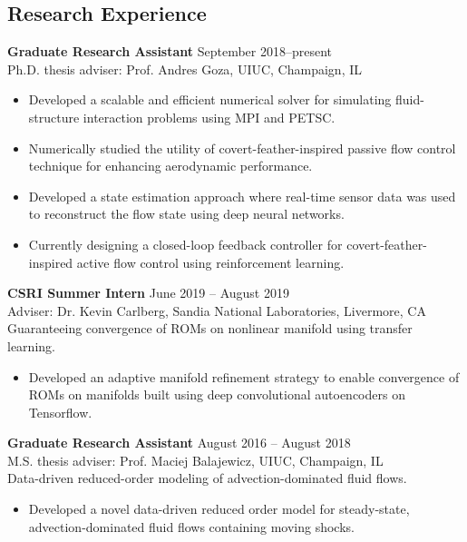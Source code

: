 \documentclass[margin]{res}
\begin{document}
\begin{resume}
\section{\large Research Experience}
{\bf Graduate Research Assistant} \hfill September 2018--present\\
Ph.D. thesis adviser: Prof. Andres Goza, UIUC, Champaign, IL 
\begin{itemize}
	\item Developed a scalable and efficient numerical solver for simulating fluid-structure interaction problems using MPI and PETSC.
	\item Numerically studied the utility of covert-feather-inspired passive flow control technique for enhancing aerodynamic performance.
	\item Developed a state estimation approach where real-time sensor data was used to reconstruct the flow state using deep neural networks.
	\item Currently designing a closed-loop feedback controller for covert-feather-inspired active flow control using reinforcement learning.
\end{itemize}

{\bf CSRI Summer Intern} \hfill June 2019 -- August 2019\\
Adviser: Dr. Kevin Carlberg, Sandia National Laboratories, Livermore, CA \\
%
Guaranteeing convergence of ROMs on nonlinear manifold using transfer learning.
\begin{itemize}
\item Developed an adaptive manifold refinement strategy to enable convergence of ROMs on manifolds built using deep convolutional autoencoders on Tensorflow.
\end{itemize}

{\bf Graduate Research Assistant} \hfill August 2016 -- August 2018\\
M.S. thesis adviser: Prof. Maciej Balajewicz, UIUC, Champaign, IL \\
Data-driven reduced-order modeling of advection-dominated fluid flows.
\begin{itemize}
\item Developed a novel data-driven reduced order model for steady-state, advection-dominated fluid flows containing moving shocks.
\end{itemize}



\end{resume}
\end{document}

